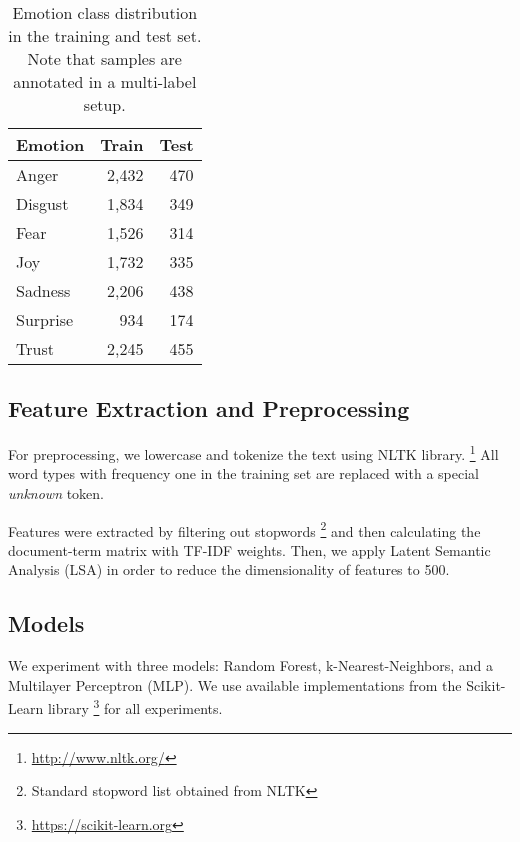 \documentclass[11pt,a4paper]{article}
\begin{document}
\begin{table}[]
\centering
\begin{tabular}{|l|r|r|}
\hline
Emotion  & \multicolumn{1}{c|}{Train} & \multicolumn{1}{c|}{Test} \\ \hline
Anger    & 2,432                      & 470                       \\ \hline
Disgust  & 1,834                      & 349                       \\ \hline
Fear     & 1,526                      & 314                       \\ \hline
Joy      & 1,732                      & 335                       \\ \hline
Sadness  & 2,206                      & 438                       \\ \hline
Surprise & 934                        & 174                       \\ \hline
Trust    & 2,245                      & 455                       \\ \hline
\end{tabular}
\caption{Emotion class distribution in the training and test set. Note that samples are annotated in a multi-label setup.}
\label{table:corpus-stats}
\end{table}

\subsection{Feature Extraction and Preprocessing}

For preprocessing, we lowercase and tokenize the text using NLTK library. \footnote{\url{http://www.nltk.org/}}
All word types with frequency one in the training set are replaced with a special {\it unknown} token.

Features were extracted by filtering out stopwords \footnote{Standard stopword list obtained from NLTK} and then calculating the document-term matrix with TF-IDF weights. Then, we apply Latent Semantic Analysis (LSA) in order to reduce the dimensionality of features to 500.

\subsection{Models}

We experiment with three models: Random Forest, k-Nearest-Neighbors, and a Multilayer Perceptron (MLP).
We use available implementations from the Scikit-Learn library \footnote{\url{https://scikit-learn.org}} for all experiments.
\end{document}
